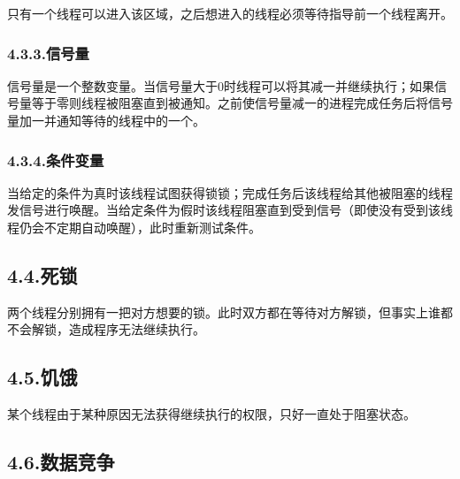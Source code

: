 \documentclass{article}
\begin{document}
\noindent{}只有一个线程可以进入该区域，之后想进入的线程必须等待指导前一个线程离开。%

\subsubsection{4.3.3.\hspace*{0.5em}信号量}\label{section}%

\noindent{}信号量是一个整数变量。当信号量大于0时线程可以将其减一并继续执行；如果信号量等于零则线程被阻塞直到被通知。之前使信号量减一的进程完成任务后将信号量加一并通知等待的线程中的一个。%

\subsubsection{4.3.4.\hspace*{0.5em}条件变量}\label{section}%

\noindent{}当给定的条件为真时该线程试图获得锁锁；完成任务后该线程给其他被阻塞的线程发信号进行唤醒。当给定条件为假时该线程阻塞直到受到信号（即使没有受到该线程仍会不定期自动唤醒），此时重新测试条件。%

\subsection{4.4.\hspace*{0.5em}死锁}\label{section}%

\noindent{}两个线程分别拥有一把对方想要的锁。此时双方都在等待对方解锁，但事实上谁都不会解锁，造成程序无法继续执行。%

\subsection{4.5.\hspace*{0.5em}饥饿}\label{section}%

\noindent{}某个线程由于某种原因无法获得继续执行的权限，只好一直处于阻塞状态。%

\subsection{4.6.\hspace*{0.5em}数据竞争}\label{section}%
\end{document}
